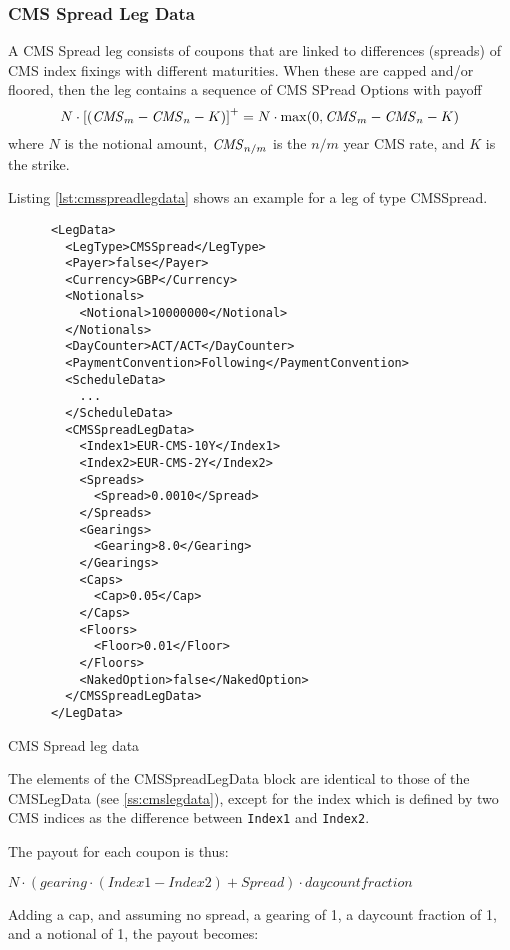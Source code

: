 \subsubsection{CMS Spread Leg Data}
\label{ss:cmsspreadlegdata}

A CMS Spread leg consists of coupons that are linked to differences (spreads)
of CMS index fixings with different maturities. When these are capped and/or floored,
then the leg contains a sequence of CMS SPread Options with payoff
$$
N\cdot\left[(\mathit{CMS}_m -\mathit{CMS}_n - K)\right]^+ = N\cdot \max(0,\mathit{CMS}_m-\mathit{CMS}_n - K)
$$
where $N$ is the notional amount, $\mathit{CMS}_{n/m}$ is the $n/m$ year CMS rate,
and $K$ is the strike.

Listing \ref{lst:cmsspreadlegdata} shows an example for a leg of type CMSSpread.

\begin{listing}[H]
\begin{verbatim}
      <LegData>
        <LegType>CMSSpread</LegType>
        <Payer>false</Payer>
        <Currency>GBP</Currency>
        <Notionals>
          <Notional>10000000</Notional>
        </Notionals>
        <DayCounter>ACT/ACT</DayCounter>
        <PaymentConvention>Following</PaymentConvention>
        <ScheduleData>
          ...
        </ScheduleData>
        <CMSSpreadLegData>
          <Index1>EUR-CMS-10Y</Index1>
          <Index2>EUR-CMS-2Y</Index2>
          <Spreads>
            <Spread>0.0010</Spread>
          </Spreads>
          <Gearings>
            <Gearing>8.0</Gearing>
          </Gearings>
          <Caps>
            <Cap>0.05</Cap>
          </Caps>
          <Floors>
            <Floor>0.01</Floor>
          </Floors>
          <NakedOption>false</NakedOption>  
        </CMSSpreadLegData>
      </LegData>
\end{verbatim}
\caption{CMS Spread leg data}
\label{lst:cmsspreadlegdata}
\end{listing}

The elements of the CMSSpreadLegData block are identical to those of the CMSLegData (see \ref{ss:cmslegdata}), except
for the index which is defined by two CMS indices as the difference between \verb+Index1+ and \verb+Index2+.

The payout for each coupon is thus:

$
N \cdot (gearing \cdot (Index1 - Index2) + Spread)  \cdot daycountfraction
$

Adding a cap, and assuming no spread,  a gearing of 1, a daycount fraction of 1, and a notional of 1, the payout becomes:

